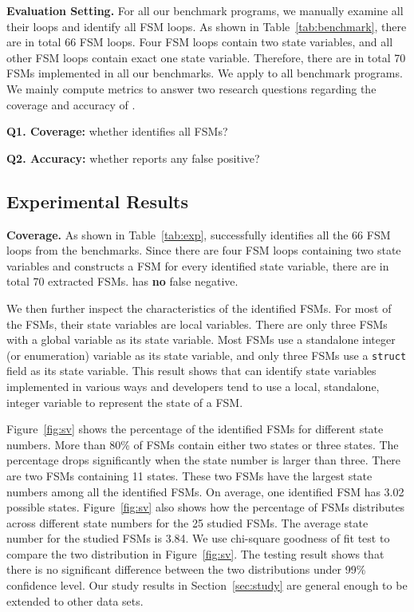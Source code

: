\noindent\textbf{Evaluation Setting.} 
For all our benchmark programs, we manually examine all their loops and 
identify all FSM loops. 
As shown in Table~\ref{tab:benchmark}, there are in 
total 66 FSM loops.
Four FSM loops contain two state variables, 
and all other FSM loops contain exact one state variable.
Therefore, there are in total 70 FSMs implemented in all our benchmarks.  
We apply \Tool{} to all benchmark programs. 
We mainly compute metrics to answer two research 
questions regarding the coverage and accuracy of \Tool{}.

\noindent\textbf{Q1. Coverage:} whether \Tool{} identifies all FSMs?
 
\noindent\textbf{Q2. Accuracy:} whether \Tool{} reports any false positive?

\subsection{Experimental Results}
\label{sec:results}



\noindent\textbf{Coverage.}
As shown in Table~\ref{tab:exp}, \Tool{} successfully identifies 
all the 66 FSM loops 
from the benchmarks. Since there are four FSM loops containing 
two state variables and \Tool{} constructs a FSM for every identified state variable, 
there are in total 70 extracted FSMs. 
\Tool{} has \textbf{no} false negative.

We then further inspect the characteristics of the identified FSMs.
For most of the FSMs, their state variables are local variables.
There are only three FSMs with a global variable as its state variable. 
Most FSMs use a standalone integer (or enumeration) variable as its state variable,
and only three FSMs use a \texttt{struct} field as its state variable.  
This result shows that \Tool{} can identify state variables implemented in various ways
and developers tend to use a local, standalone, integer variable to 
represent the state of a FSM.




Figure~\ref{fig:sv} shows the percentage of the identified FSMs
for different state numbers. 
More than 80\% of FSMs contain either two states or three states. 
The percentage drops significantly when the state number is larger than three. 
There are two FSMs containing 11 states. 
These two FSMs have the largest state numbers among all the identified FSMs. 
On average, one identified FSM has 3.02 possible states. 
Figure~\ref{fig:sv} also shows how the percentage of FSMs distributes 
across different state numbers 
for the 25 studied FSMs. 
The average state number for the studied FSMs is 3.84.
We use chi-square goodness of fit test to compare 
the two distribution in Figure~\ref{fig:sv}. 
The testing result shows that there is no significant 
difference between the two distributions 
under 99\% confidence level. 
Our study results in Section~\ref{sec:study} are general enough to be 
extended to other data sets. 

